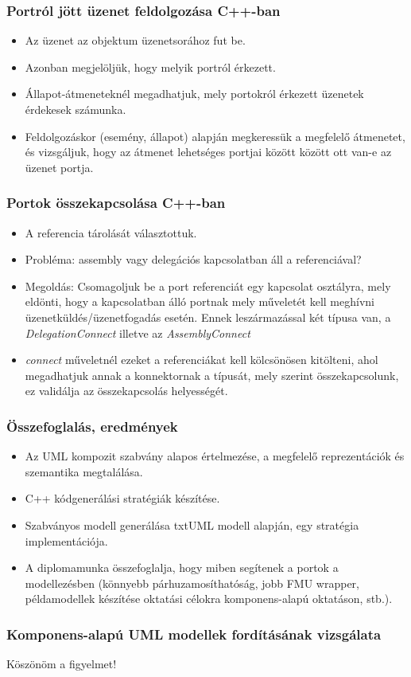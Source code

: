 \documentclass[11pt]{beamer}
\begin{document}
\begin{frame}[fragile]
	\frametitle{Portról jött üzenet feldolgozása C++-ban}
	\begin{itemize}
	\item Az üzenet az objektum üzenetsorához fut be.
	\item Azonban megjelöljük, hogy melyik portról érkezett.
	\item Állapot-átmeneteknél megadhatjuk, mely portokról érkezett üzenetek érdekesek számunka.
	\item Feldolgozáskor (esemény, állapot) alapján megkeressük a megfelelő átmenetet, és vizsgáljuk, hogy az átmenet lehetséges portjai között között ott van-e az üzenet portja.
	\end{itemize}

\end{frame}



\begin{frame}
	\frametitle{Portok összekapcsolása C++-ban}
	\begin{itemize}
	\item A referencia tárolását választottuk.
	\item Probléma: assembly vagy delegációs kapcsolatban áll a referenciával?
	\item Megoldás: Csomagoljuk be a port referenciát egy kapcsolat osztályra, mely eldönti, hogy a kapcsolatban álló portnak mely műveletét kell meghívni üzenetküldés/üzenetfogadás esetén. Ennek leszármazással két típusa van, a \textit{DelegationConnect} illetve az \textit{AssemblyConnect} 
	\item \textit{connect} műveletnél ezeket a referenciákat kell kölcsönösen kitölteni, ahol megadhatjuk annak a konnektornak a típusát, mely szerint összekapcsolunk, ez validálja az összekapcsolás helyességét. 
	\end{itemize}
		
\end{frame}

\begin{frame}
	\frametitle{Összefoglalás, eredmények}
	\begin{itemize}
	\item Az UML kompozit szabvány alapos értelmezése, a megfelelő reprezentációk és szemantika megtalálása.
	\item C++ kódgenerálási stratégiák készítése.
	\item Szabványos modell generálása txtUML modell alapján, egy stratégia implementációja.
	\item A diplomamunka összefoglalja, hogy miben segítenek a portok a modellezésben (könnyebb párhuzamosíthatóság, jobb FMU wrapper, példamodellek készítése oktatási célokra komponens-alapú oktatáson, stb.).
	\end{itemize}
\end{frame}

\begin{frame}
	\frametitle{Komponens-alapú UML modellek fordításának vizsgálata}
	\begin{center}
		\Large{Köszönöm a figyelmet!}
	\end{center}
\end{frame}
\end{document}
